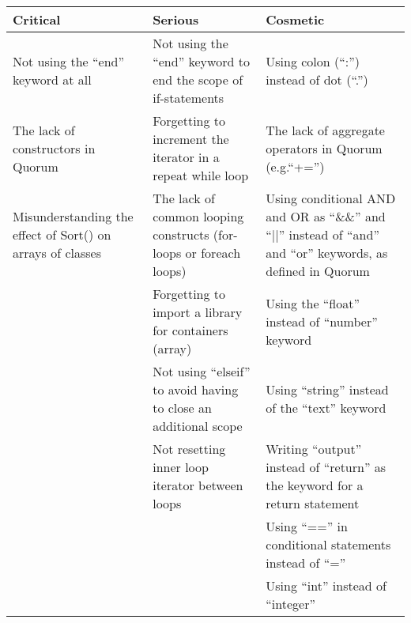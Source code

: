 \begin{table}[]
\centering
\renewcommand{\arraystretch}{1.5}
\label{QuorumProblemResult}
\begin{tabular}{| p{5cm} | p{5cm} | p{5cm} |}
\hline
\textbf{Critical}                                          & \textbf{Serious}                                                   & \textbf{Cosmetic}                                                                                        \\ \hline
Not using the “end” keyword at all                         & Not using the “end” keyword to end the scope of if-statements      & Using colon (“:”) instead of dot (“.”)                                                                   \\ \hline
The lack of constructors in Quorum                         & Forgetting to increment the iterator in a repeat while loop        & The lack of aggregate operators in Quorum (e.g.“+=”)                                                        \\ \hline
Misunderstanding the effect of Sort() on arrays of classes & The lack of common looping constructs (for-loops or foreach loops) & Using conditional AND and OR as “\&\&” and “||” instead of “and” and “or” keywords, as defined in Quorum \\ \hline
                                                           & Forgetting to import a library for containers (array)              & Using the “float” instead of “number” keyword                                                            \\ \hline
                                                           & Not using “elseif” to avoid having to close an additional scope    & Using “string” instead of the “text” keyword                                                             \\ \hline
                                                           & Not resetting inner loop iterator between loops                    & Writing “output” instead of “return” as the keyword for a return statement                               \\ \hline
                                                           &                                                                    & Using “==” in conditional statements instead of “=”                                                      \\ \hline
                                                           &                                                                    & Using “int” instead of “integer”                                                                         \\ \hline

\end{tabular}
\end{table}
